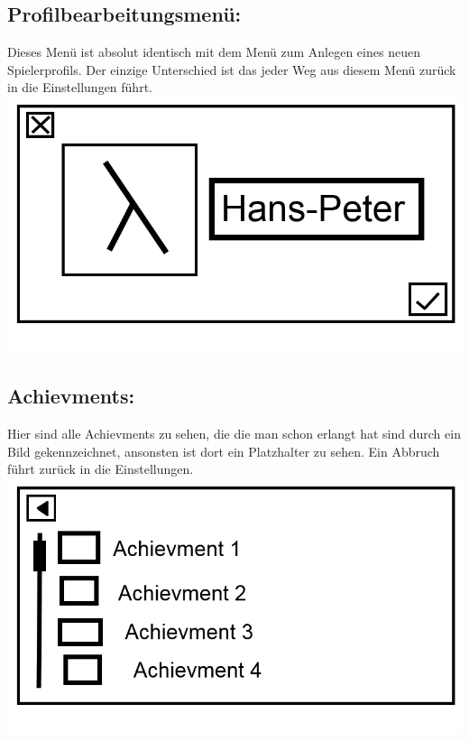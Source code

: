 \documentclass{scrartcl}
\begin{document}
\begin{enumerate}
	\begin{minipage}{1\textwidth}
		\item \subsection*{Profilbearbeitungsmenü:}
		Dieses Menü ist absolut identisch mit dem Menü zum Anlegen eines neuen Spielerprofils. Der einzige Unterschied ist das jeder Weg aus diesem Menü zurück in die Einstellungen führt.\\
		\includegraphics[width=\textwidth, height=7.5cm]{assets/CreateProfile}
	\end{minipage}

	\begin{minipage}{1\textwidth}
		\item \subsection*{Achievments:}
		Hier sind alle Achievments zu sehen, die die man schon erlangt hat sind durch ein Bild gekennzeichnet, ansonsten ist dort ein Platzhalter zu sehen. Ein Abbruch führt zurück in die Einstellungen.\\
		\includegraphics[width=\textwidth, height=7.5cm]{assets/Achievments}
	\end{minipage}
	

\end{enumerate}
\end{document}

